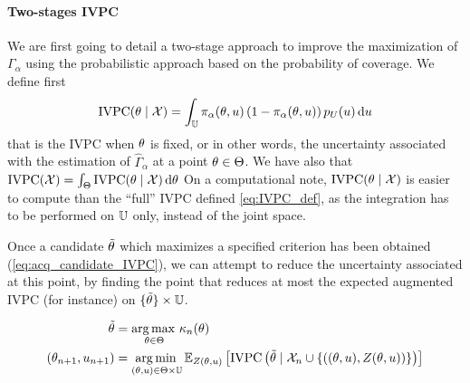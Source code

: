 \documentclass[../../Main_ManuscritThese.tex]{subfiles}
\begin{document}
\paragraph{Two-stages IVPC}
We are first going to detail a two-stage approach to improve the maximization of $\Gamma_\alpha$ using the probabilistic approach based on the probability of coverage.
We define first 
\begin{equation}
  \mathrm{IVPC}(\theta\mid \mathcal{X}) = \int_{\mathbb{U}} \pi_{\alpha}(\theta, u)\left(1 - \pi_{\alpha}(\theta, u)\right)p_{U}(u)\, \mathrm{d}u
\end{equation}
that is the $\mathrm{IVPC}$ when $\theta$ is fixed, or in other words, the uncertainty associated with the estimation of $\hat{\Gamma}_{\alpha}$ at a point $\theta \in \Theta$. We have also that $\mathrm{IVPC}(\mathcal{X}) = \int_{\Theta} \mathrm{IVPC}(\theta \mid \mathcal{X}) \,\mathrm{d}\theta$
On a computational note,  $\mathrm{IVPC}(\theta\mid \mathcal{X})$ is easier to compute than the ``full'' $\mathrm{IVPC}$ defined \cref{eq:IVPC_def}, as the integration has to be performed on $\mathbb{U}$ only, instead of the joint space.


Once a candidate $\tilde{\theta}$  which maximizes a specified criterion has been obtained (\cref{eq:acq_candidate_IVPC}), we can attempt to reduce the uncertainty associated at this point, by finding the point that reduces at most the expected augmented IVPC (for instance) on $\{\tilde{\theta}\}\times \mathbb{U}$.

\begin{align}
  \tilde{\theta} &= \operatorname*{arg\,max \,}_{\theta\in \Theta} \kappa_n(\theta) \label{eq:acq_candidate_IVPC}\\
  (\theta_{n+1}, u_{n+1}) & = \operatorname*{arg\,min \,}_{(\theta,u) \in \Theta \times \mathbb{U}} \mathbb{E}_{Z(\theta, u)}\left[ \mathrm{IVPC}\left(\tilde{\theta} \mid \mathcal{X}_n \cup\left\{\left((\theta,u), Z(\theta, u)\right)\right\} \right)  \right]
\end{align}
\end{document}
